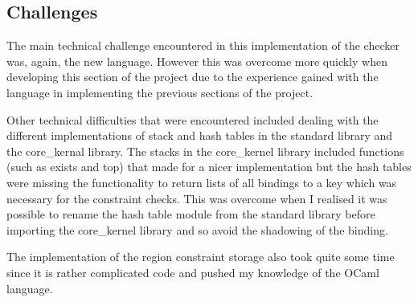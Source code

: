 \subsection{Challenges}
The main technical challenge encountered in this implementation of the checker was, again, the new language. However this was overcome more quickly when developing this section of the project due to the experience gained with the language in implementing the previous sections of the project. 

Other technical difficulties that were encountered included dealing with the different implementations of stack and hash tables in the standard library and the core_kernal library. The stacks in the core_kernel library \cite{janest} included functions (such as exists and top) that made for a nicer implementation but the hash tables were missing the functionality to return lists of all bindings to a key which was necessary for the constraint checks. This was overcome when I realised it was possible to rename the hash table module from the standard library before importing the core_kernel library and so avoid the shadowing of the binding. 

The implementation of the region constraint storage also took quite some time since it is rather complicated code and pushed my knowledge of the OCaml language. 


